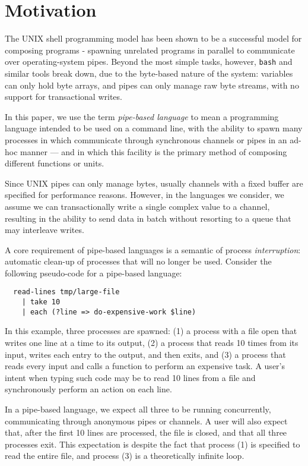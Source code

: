 \documentclass[sigplan,10pt,nosumlimits]{acmart}
\begin{document}
\section{Motivation}

The UNIX shell programming model has been shown to be a successful model for composing programs - spawning unrelated programs in parallel to communicate over operating-system pipes. Beyond the most simple tasks, however, \verb/bash/ and similar tools break down, due to the byte-based nature of the system: variables can only hold byte arrays, and pipes can only manage raw byte streams, with no support for transactional writes.

In this paper, we use the term \emph{pipe-based language} to mean a programming language intended to be used on a command line, with the ability to spawn many processes in which communicate through synchronous channels or pipes in an ad-hoc manner --- and in which this facility is the primary method of composing different functions or units.

Since UNIX pipes can only manage bytes, usually channels with a fixed buffer are specified for performance reasons. However, in the languages we consider, we assume we can transactionally write a single complex value to a channel, resulting in the ability to send data in batch without resorting to a queue that may interleave writes.

A core requirement of pipe-based languages is a semantic of process \emph{interruption}: automatic clean-up of processes that will no longer be used. Consider the following pseudo-code for a pipe-based language:

\begin{verbatim}
  read-lines tmp/large-file
    | take 10
    | each (?line => do-expensive-work $line)
\end{verbatim}
In this example, three processes are spawned: (1) a process with a file open that writes one line at a time to its output, (2) a process that reads 10 times from its input, writes each entry to the output, and then exits, and (3) a process that reads every input and calls a function to perform an expensive task.
A user's intent when typing such code may be to read 10 lines from a file and synchronously perform an action on each line.

In a pipe-based language, we expect all three to be running concurrently, communicating through anonymous pipes or channels.
A user will also expect that, after the first 10 lines are processed, the file is closed, and that all three processes exit.
This expectation is despite the fact that process (1) is specified to read the entire file, and process (3) is a theoretically infinite loop.
\end{document}
